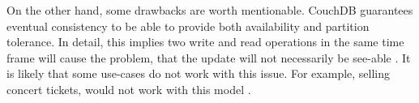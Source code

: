 \newline
On the other hand, some drawbacks are worth mentionable.
CouchDB guarantees eventual consistency to be able to provide both availability and partition tolerance. In detail, this implies two write and read operations in the same time frame will cause the problem, that the update will not necessarily be see-able \cite{EminGunSirer}.
It is likely that some use-cases do not work with this issue. For example, selling concert tickets, would not work with this model \cite{EminGunSirer}. \\
%
%
%
